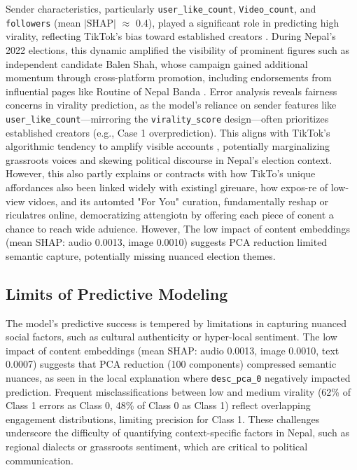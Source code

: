 \documentclass[12pt,a4paper]{report}
\begin{document}
Sender characteristics, particularly \texttt{user\_like\_count}, \texttt{Video\_count}, and \texttt{followers} (mean $|\text{SHAP}|$ $\approx$ 0.4), played a significant role in predicting high virality, reflecting TikTok’s bias toward established creators \parencite{bucher2018ifthen}. During Nepal’s 2022 elections, this dynamic amplified the visibility of prominent figures such as independent candidate Balen Shah, whose campaign gained additional momentum through cross-platform promotion, including endorsements from influential pages like Routine of Nepal Banda \parencite{Kandel2024}.
\newpage
Error analysis reveals fairness concerns in virality prediction, as the model’s reliance on sender features like \texttt{user\_like\_count}—mirroring the \texttt{virality\_score} design—often prioritizes established creators (e.g., Case 1 overprediction). This aligns with TikTok’s algorithmic tendency to amplify visible accounts \parencite{noble2018algorithms}, potentially marginalizing grassroots voices and skewing political discourse in Nepal’s election context. However, this also partly explains or contracts with how TikTo's unique affordances also been linked widely with existingl gireuare, how expos-re of low-view vidoes, and its automted "For You" curation, fundamentally reshap or riculatres online, democratizing attengiotn by offering each piece of conent a chance to reach wide aduience\parencite{guinaudeau2022fifteen}. However, The low impact of content embeddings (mean SHAP: audio 0.0013, image 0.0010) suggests PCA reduction limited semantic capture, potentially missing nuanced election themes. 

\subsection{Limits of Predictive Modeling}
The model’s predictive success is tempered by limitations in capturing nuanced social factors, such as cultural authenticity or hyper-local sentiment. The low impact of content embeddings (mean SHAP: audio 0.0013, image 0.0010, text 0.0007) suggests that PCA reduction (100 components) compressed semantic nuances, as seen in the local explanation where \texttt{desc\_pca\_0} negatively impacted prediction. Frequent misclassifications between low and medium virality (62\% of Class 1 errors as Class 0, 48\% of Class 0 as Class 1) reflect overlapping engagement distributions, limiting precision for Class 1. These challenges underscore the difficulty of quantifying context-specific factors in Nepal, such as regional dialects or grassroots sentiment, which are critical to political communication.
\newpage
\end{document}

